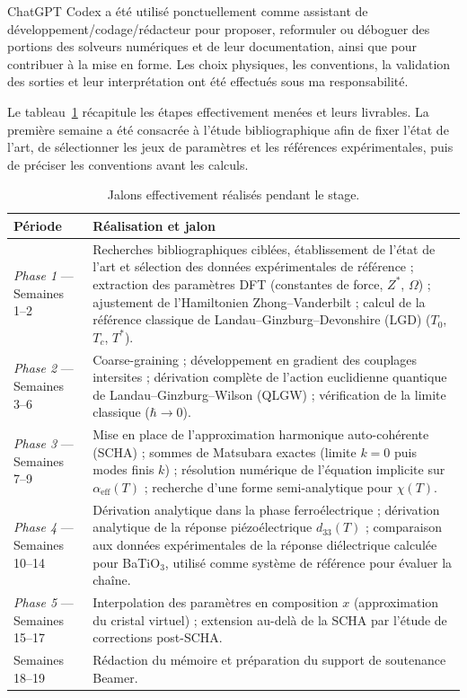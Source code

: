 \documentclass{rapportCS}
\begin{document}
ChatGPT Codex a été utilisé ponctuellement comme assistant de développement/codage/rédacteur
pour proposer, reformuler ou déboguer des portions des solveurs numériques et de
leur documentation, ainsi que pour contribuer à la mise en forme. Les choix physiques, les conventions, la validation des sorties et leur interprétation
ont été effectués sous ma responsabilité.

Le tableau~\ref{tab:cs_macro_planning} récapitule les étapes effectivement
menées et leurs livrables. La première semaine a été consacrée à l'étude bibliographique afin de
fixer l'état de l'art, de sélectionner les jeux de paramètres et les références
expérimentales, puis de préciser les conventions avant les calculs.

\begin{table}[H]
\centering
\caption{Jalons effectivement réalisés pendant le stage.}
\label{tab:cs_macro_planning}
\begingroup
\footnotesize
\setlength{\tabcolsep}{4pt}
\renewcommand{\arraystretch}{1.02}
\begin{tabular}{|>{\raggedright\arraybackslash}p{}|
                  >{\raggedright\arraybackslash}p{}|}
\hline
\textbf{Période} & \textbf{Réalisation et jalon} \\
\hline
\textit{Phase 1} --- Semaines 1--2 &
  Recherches bibliographiques ciblées, établissement de l'état de l'art et
  sélection des données expérimentales de référence ; extraction des paramètres
  DFT (constantes de force,
  $Z^*$, $\Omega$) ; ajustement de l'Hamiltonien Zhong--Vanderbilt ; calcul de
  la référence classique de Landau--Ginzburg--Devonshire (LGD)
  ($T_0$, $T_c$, $T^*$). \\
\hline
\textit{Phase 2} --- Semaines 3--6 &
  Coarse-graining ; développement en gradient des couplages intersites ;
  dérivation complète de l'action euclidienne quantique de
  Landau--Ginzburg--Wilson (QLGW) ; vérification de la limite classique
  ($\hbar\to0$). \\
\hline
\textit{Phase 3} --- Semaines 7--9 &
  Mise en place de l'approximation harmonique auto-cohérente (SCHA) ; sommes de
  Matsubara exactes (limite $k=0$ puis modes finis $k$) ; résolution numérique de l'équation implicite sur
  $\alpha_{\mathrm{eff}}(T)$ ; recherche d'une forme semi-analytique pour
  $\chi(T)$. \\
\hline
\textit{Phase 4} --- Semaines 10--14 &
  Dérivation analytique dans la phase ferroélectrique ; dérivation analytique
  de la réponse piézoélectrique $d_{33}(T)$ ; comparaison aux données
  expérimentales de la réponse diélectrique calculée pour BaTiO$_3$, utilisé
  comme système de référence pour évaluer la chaîne. \\
\hline
\textit{Phase 5} --- Semaines 15--17 &
  Interpolation des paramètres en composition $x$ (approximation du cristal
  virtuel) ; extension au-delà de la SCHA par l'étude de corrections
  post-SCHA. \\
\hline
Semaines 18--19 &
  Rédaction du mémoire et préparation du support de soutenance Beamer. \\
\hline
\end{tabular}
\endgroup
\end{table}
\end{document}

